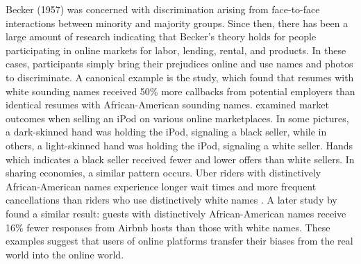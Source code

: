 Becker (1957) was concerned with discrimination arising from face-to-face interactions between minority and majority groups. Since then, there has been a large amount of research indicating that Becker's theory holds for people participating in online markets for labor, lending, rental, and products. In these cases, participants simply bring their prejudices online and use names and photos to discriminate. A canonical example is the \cite{bertrand} study, which found that resumes with white sounding names received 50\% more callbacks from potential employers than identical resumes with African-American sounding names. \cite{doleac} examined market outcomes when selling an iPod on various online marketplaces. In some pictures, a dark-skinned hand was holding the iPod, signaling a black seller, while in others, a light-skinned hand was holding the iPod, signaling a white seller. Hands which indicates a black seller received fewer and lower offers than white sellers. In sharing economies, a similar pattern occurs. Uber riders with distinctively African-American names experience longer wait times and more frequent cancellations than riders who use distinctively white names \citep{knittel}. A later study by \cite{edelman2} found a similar result: guests with distinctively African-American names receive 16\% fewer responses from Airbnb hosts than those with white names. These examples suggest that users of online platforms transfer their biases from the real world into the online world.  

